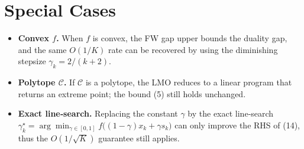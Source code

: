 \documentclass{article}
\begin{document}
\section*{Special Cases}
\begin{itemize}
    \item \textbf{Convex $f$.} When $f$ is convex, the FW gap upper bounds the duality gap, and the same $O(1/K)$ rate can be recovered by using the diminishing stepsize $\gamma_{k}=2/(k+2)$.
    \item \textbf{Polytope $\mathcal{C}$.} If $\mathcal{C}$ is a polytope, the LMO reduces to a linear program that returns an extreme point; the bound (5) still holds unchanged.
    \item \textbf{Exact line‑search.} Replacing the constant $\gamma$ by the exact line‑search
    $\gamma_{k}^{\star}= \arg\min_{\gamma\in[0,1]} f\bigl((1-\gamma)x_{k}+\gamma s_{k}\bigr)$
    can only improve the RHS of (14), thus the $O(1/\sqrt{K})$ guarantee still applies.
\end{itemize}
\end{document}
